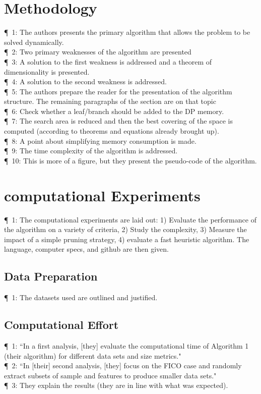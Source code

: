 \documentclass[11pt]{article}
\begin{document}

\section{Methodology}
\P\, 1: The authors presents the primary algorithm that allows the problem to be solved dynamically.\\
\P\, 2: Two primary weaknesses of the algorithm are presented\\
\P\, 3: A solution to the first weakness is addressed and a theorem of dimensionality is presented.\\
\P\, 4: A solution to the second weakness is addressed.\\
\P\, 5: The authors prepare the reader for the presentation of the algorithm structure. The remaining paragraphs of the section are on that topic\\
\P\, 6: Check whether a leaf/branch should be added to the DP memory.\\
\P\, 7: The search area is reduced and then the best  covering of the space is computed (according to theorems and equations already brought up).\\
\P\, 8: A point about simplifying memory consumption is made.\\
\P\, 9: The time complexity of the algorithm is addressed.\\
\P\, 10: This is more of a figure, but they present the pseudo-code of the algorithm.


\section{computational Experiments}
\P\, 1: The computational experiments are laid out: 1) Evaluate the performance of the algorithm on a variety of criteria, 2) Study the complexity, 3) Measure the impact of a simple pruning strategy, 4) evaluate a fast heuristic algorithm. The language, computer specs, and github are then given. 
\subsection{Data Preparation}
\P\, 1: The datasets used are outlined and justified.
\subsection{Computational Effort}
\P\, 1: ``In a first analysis, [they] evaluate the computational time of Algorithm 1 (their algorithm) for different data sets and size metrics."\\
\P\, 2: ``In [their] second analysis, [they] focus on the FICO case and randomly extract subsets of sample and features to produce smaller data sets."\\
\P\, 3: They explain the results (they are in line with what was expected).
\end{document}

